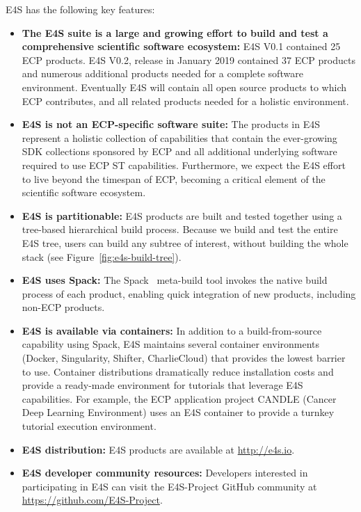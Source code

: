 E4S has the following key features:
\begin{itemize}
	\item \textbf{The E4S suite is a large and growing effort to build and test a comprehensive scientific software ecosystem:} E4S V0.1 contained 25 ECP products.  E4S V0.2, release in January 2019 contained 37 ECP products and numerous additional products needed for a complete software environment.  Eventually E4S will contain all open source products to which ECP contributes, and all related products needed for a holistic environment.
	\item \textbf{E4S is not an ECP-specific software suite:}  The products in E4S represent a holistic collection of capabilities that contain the ever-growing SDK collections sponsored by ECP and all additional underlying software required to use ECP ST capabilities.  Furthermore, we expect the E4S effort to live beyond the timespan of ECP, becoming a critical element of the scientific software ecosystem.
	\item \textbf{E4S is partitionable:} E4S products are built and tested together using a tree-based hierarchical build process.  Because we build and test the entire E4S tree, users can build any subtree of interest, without building the whole stack (see Figure~\ref{fig:e4s-build-tree}).
	\item \textbf{E4S uses Spack:} The Spack~\cite{gamblin+:ecp18-spack-tutorial} meta-build tool invokes the native build process of each product, enabling quick integration of new products, including non-ECP products.
	\item \textbf{E4S is available via containers:} In addition to a build-from-source capability using Spack, E4S maintains several container environments (Docker, Singularity, Shifter, CharlieCloud) that provides the lowest barrier to use.  Container distributions dramatically reduce installation costs and provide a ready-made environment for tutorials that leverage E4S capabilities.  For example, the ECP  application project CANDLE (Cancer Deep Learning Environment) uses an E4S container to provide a turnkey tutorial execution environment.
	\item \textbf{E4S distribution:} E4S products are available at \url{http://e4s.io}.
	\item \textbf{E4S developer community resources:} Developers interested in participating in E4S can visit the E4S-Project GitHub community at \url{https://github.com/E4S-Project}.	
\end{itemize}

